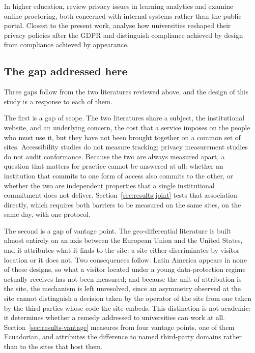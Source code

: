 \documentclass[pdflatex,sn-basic,Numbered]{sn-jnl}
\theoremstyle{thmstyleone}
\theoremstyle{thmstyletwo}
\theoremstyle{thmstylethree}
\begin{document}
In higher education, \citet{liu2023understanding} review privacy issues in learning analytics and \citet{mutimukwe2025privacy} examine online proctoring, both concerned with internal systems rather than the public portal. Closest to the present work, \citet{munot2025compliance} analyse how universities reshaped their privacy policies after the GDPR and distinguish compliance achieved by design from compliance achieved by appearance.

\subsection{The gap addressed here}\label{sec:related-gap}

Three gaps follow from the two literatures reviewed above, and the design of this study is a response to each of them.

The first is a gap of scope. The two literatures share a subject, the institutional website, and an underlying concern, the cost that a service imposes on the people who must use it, but they have not been brought together on a common set of sites. Accessibility studies do not measure tracking; privacy measurement studies do not audit conformance. Because the two are always measured apart, a question that matters for practice cannot be answered at all: whether an institution that commits to one form of access also commits to the other, or whether the two are independent properties that a single institutional commitment does not deliver. Section~\ref{sec:results-joint} tests that association directly, which requires both barriers to be measured on the same sites, on the same day, with one protocol.

The second is a gap of vantage point. The geo-differential literature is built almost entirely on an axis between the European Union and the United States, and it attributes what it finds to the site: a site either discriminates by visitor location or it does not. Two consequences follow. Latin America appears in none of these designs, so what a visitor located under a young data-protection regime actually receives has not been measured; and because the unit of attribution is the site, the mechanism is left unresolved, since an asymmetry observed at the site cannot distinguish a decision taken by the operator of the site from one taken by the third parties whose code the site embeds. This distinction is not academic: it determines whether a remedy addressed to universities can work at all. Section~\ref{sec:results-vantage} measures from four vantage points, one of them Ecuadorian, and attributes the difference to named third-party domains rather than to the sites that host them.
\end{document}
